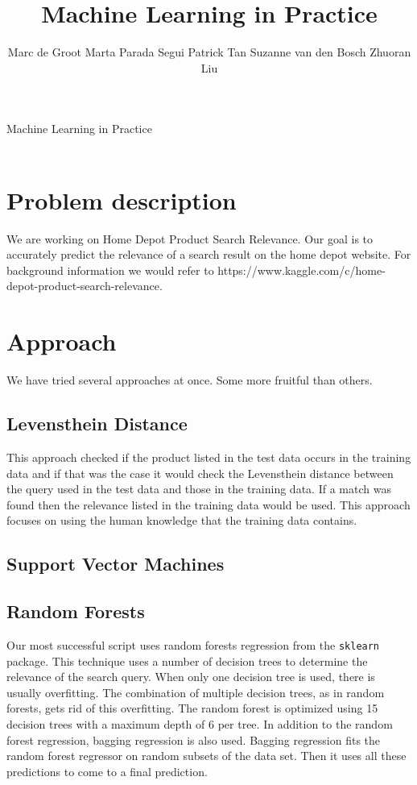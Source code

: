 \documentclass{article}
\title{Machine Learning in Practice}
\author{
Marc de Groot
Marta Parada Segui
Patrick Tan
Suzanne van den Bosch
Zhuoran Liu}
\begin{document}
{\Huge Machine Learning in Practice}
\\
\\

\section{Problem description}

We are working on Home Depot Product Search Relevance. Our goal is to accurately predict the relevance of a search result on the home depot website. For background information we would refer to https://www.kaggle.com/c/home-depot-product-search-relevance.

\section{Approach}

We have tried several approaches at once. Some more fruitful than others.

\subsection{Levensthein Distance}
This approach checked if the product listed in the test data occurs in the training data and if that was the case it would check the Levensthein distance between the query used in the test data and those in the training data. If a match was found then the relevance listed in the training data would be used. This approach focuses on using the human knowledge that the training data contains.

\subsection{Support Vector Machines}

\subsection{Random Forests}
Our most successful script uses random forests regression from the \texttt{sklearn} package. 
This technique uses a number of decision trees to determine the relevance of the search query. 
When only one decision tree is used, there is usually overfitting. The combination of multiple decision trees, as in random forests, gets rid of this overfitting. 
The random forest is optimized using 15 decision trees with a maximum depth of 6 per tree. 
In addition to the random forest regression, bagging regression is also used. 
Bagging regression fits the random forest regressor on random subsets of the data set. Then it uses all these predictions to come to a final prediction.  
\end{document}
